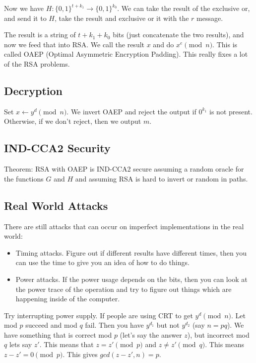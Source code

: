 \documentclass[psamsfonts]{amsart}
\begin{document}
Now we have $H: \{0,1\}^{t + k_1} \to \{0,1\}^{k_0}$. We can take the result of the exclusive or, and send it to $H$, take the result and exclusive or it with the $r$ message.

The result is a string of $t + k_1 + k_0$ bits (just concatenate the two results), and now we feed that into RSA. We call the result $x$ and do $x^e \pmod{n}$. This is called OAEP (Optimal Asymmetric Encryption Padding). This really fixes a lot of the RSA problems.

\subsection{Decryption}

Set $x \leftarrow y^d \pmod{n}$. We invert OAEP and reject the output if $0^{k_1}$ is not present. Otherwise, if we don't reject, then we output $m$. 

\subsection{IND-CCA2 Security}

Theorem: RSA with OAEP is IND-CCA2 secure assuming a random oracle for the functions $G$ and $H$ and assuming RSA is hard to invert or random in paths.

\subsection{Real World Attacks}

There are still attacks that can occur on imperfect implementations in the real world:

\begin{itemize}
  \item Timing attacks. Figure out if different results have different times, then you can use the time to give you an idea of how to do things.
  \item Power attacks. If the power usage depends on the bits, then you can look at the power trace of the operation and try to figure out things which are happening inside of the computer.
\end{itemize}

Try interrupting power supply. If people are using CRT to get $y^d \pmod{n}$. Let mod $p$ succeed and mod $q$ fail. Then you have $y^{d_1}$ but not $y^{d_2}$ (say $n = pq$). We have something that is correct mod $p$ (let's say the answer $z$), but incorrect mod $q$ lets say $z'$. This means that $z = z' \pmod{p}$ and $z \neq z' \pmod{q}$. This means $z - z' = 0 \pmod{p}$. This gives $gcd(z - z', n) = p$.
\end{document}
